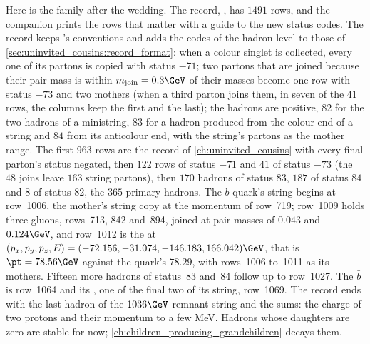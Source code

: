 Here is the family after the wedding. The record,
, has $1491$ rows, and the companion prints
the rows that matter with a guide to the new status codes.
\label{sec:children_getting_married:record_format}
The record keeps \PYTHIA's conventions and adds the codes of the hadron
level to those of \cref{sec:uninvited_cousins:record_format}: when a colour
singlet is collected, every one of its partons is copied with status $-71$;
two partons that are joined because their pair mass is within
$m_{\mathrm{join}}=0.3\GeV$ of their masses become one row with status
$-73$ and two mothers (when a third parton joins them, in seven of the
$41$ rows, the columns keep the first and the last); the hadrons are positive, $82$ for the two hadrons of
a ministring, $83$ for a hadron produced from the colour end of a string
and $84$ from its anticolour end, with the string's partons as the mother
range. The first $963$ rows are the record of \cref{ch:uninvited_cousins}
with every final parton's status negated, then $122$ rows of status $-71$
and $41$ of status $-73$ (the $48$ joins leave $163$ string partons), then
$170$ hadrons of status $83$, $187$ of status $84$ and $8$ of status $82$,
the $365$ primary hadrons. The $b$ quark's string begins at row~1006, the
mother's string copy at the momentum of row~719; row~1009 holds three
gluons, rows~713, 842 and~894, joined at pair masses of $0.043$ and
$0.124\GeV$, and row~1012 is the
\Bstarbar at $(p_x,p_y,p_z,E)=(-72.156,-31.074,-146.183,166.042)\GeV$, that
is $\pt=78.56\GeV$ against the quark's $78.29$, with rows~1006 to~1011 as
its mothers. Fifteen more hadrons of status~83 and~84 follow up to
row~1027. The $\bar b$ is row~1064 and its \Bstar, one of the final two of
its string, row~1069. The record ends with the last hadron of the
$1036\GeV$ remnant string and the sums: the charge of two protons and their
momentum to a few MeV. Hadrons whose daughters are zero are stable for now;
\cref{ch:children_producing_grandchildren} decays them.

